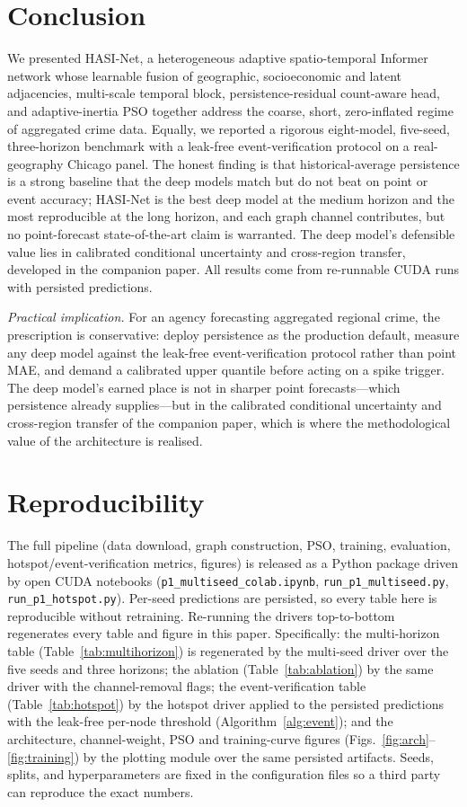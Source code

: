 \documentclass[11pt,conference]{IEEEtran}
\begin{document}
\section{Conclusion}\label{sec:conc}
We presented HASI-Net, a heterogeneous adaptive spatio-temporal Informer
network whose learnable fusion of geographic, socioeconomic and latent
adjacencies, multi-scale temporal block, persistence-residual count-aware
head, and adaptive-inertia PSO together address the coarse, short,
zero-inflated regime of aggregated crime data. Equally, we reported a rigorous
eight-model, five-seed, three-horizon benchmark with a leak-free
event-verification protocol on a real-geography Chicago panel. The honest
finding is that historical-average persistence is a strong baseline that the
deep models match but do not beat on point or event accuracy; HASI-Net is the
best deep model at the medium horizon and the most reproducible at the long
horizon, and each graph channel contributes, but no point-forecast
state-of-the-art claim is warranted. The deep model's defensible value lies in
calibrated conditional uncertainty and cross-region transfer, developed in the
companion paper. All results come from re-runnable CUDA runs with persisted
predictions.

\textit{Practical implication.} For an agency forecasting aggregated regional
crime, the prescription is conservative: deploy persistence as the production
default, measure any deep model against the leak-free event-verification
protocol rather than point MAE, and demand a calibrated upper quantile before
acting on a spike trigger. The deep model's earned place is not in sharper
point forecasts---which persistence already supplies---but in the calibrated
conditional uncertainty and cross-region transfer of the companion paper,
which is where the methodological value of the architecture is realised.

\section*{Reproducibility}
The full pipeline (data download, graph construction, PSO, training,
evaluation, hotspot/event-verification metrics, figures) is released as a
Python package driven by open CUDA notebooks (\texttt{p1\_multiseed\_colab.ipynb},
\texttt{run\_p1\_multiseed.py}, \texttt{run\_p1\_hotspot.py}). Per-seed
predictions are persisted, so every table here is reproducible without
retraining. Re-running the drivers top-to-bottom regenerates every table and
figure in this paper. Specifically: the multi-horizon table
(Table~\ref{tab:multihorizon}) is regenerated by the multi-seed driver over
the five seeds and three horizons; the ablation
(Table~\ref{tab:ablation}) by the same driver with the channel-removal flags;
the event-verification table (Table~\ref{tab:hotspot}) by the hotspot driver
applied to the persisted predictions with the leak-free per-node threshold
(Algorithm~\ref{alg:event}); and the architecture, channel-weight, PSO and
training-curve figures (Figs.~\ref{fig:arch}--\ref{fig:training}) by the
plotting module over the same persisted artifacts. Seeds, splits, and
hyperparameters are fixed in the configuration files so a third party can
reproduce the exact numbers.



\end{document}
